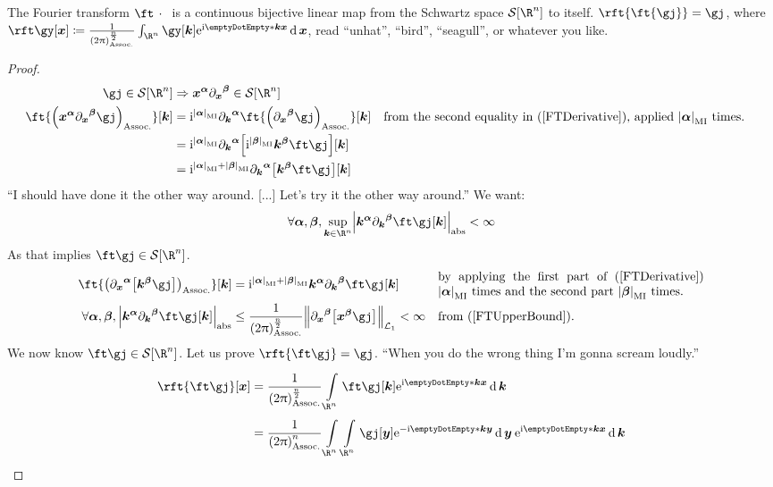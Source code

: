 \documentclass[10pt]{article}
\newcommand{\Rn}{{\R^n}}
\newcommand{\Schwartz}{{\SchwartzSpace\of{\Rn}}}
\newcommand{\sqftnrm}{\frac{1}{\pa{2\Pi}^n} }
\newcommand{\ftnrm}{\frac{1}{\pa{2\Pi}^\frac{n}{2}} }
\newcommand\commentbox[1]{\parbox{7.5cm}{#1}}
\begin{document}
  \begin{proposition}
  The Fourier transform $\ft\placeholder$ is a continuous bijective linear map from the Schwartz space $\Schwartz$ to itself. $\rft{\ft{\gj}}=\gj$, where $\rft\gy\of\vx\DefineAs\ftnrm \int\Rn\gy\of\vk\E^{\I\scal\vk\vx}\diffd\vx$, read ``unhat'', ``bird'', ``seagull'', or whatever you like.
  
    \begin{proof}
      \begin{align*}
        \gj\in\Schwartz&\Rightarrow\vx^\miga\pd\vx\migb\in\Schwartz \\
        \ft{\pa{\vx^\miga\pd\vx\migb\gj}}\of\vk
        &=\I^{\total\miga}\pd\vk\miga\ft{\pa{\pd\vx\migb\gj}}\of\vk 
          && \text{from the second equality in (\ref{FTDerivative}), applied }\total\miga\text{ times.} \\
        &=\I^{\total\miga}\pd\vk\miga\of{\I^{\total\migb}\vk^\migb\ft\gj}\of\vk \\
        &=\I^{\total\miga+\total\migb}\pd\vk\miga\of{\vk^\migb\ft\gj}\of\vk
      \end{align*}
      ``I should have done it the other way around. [...] Let's try it the other way around.''
      We want:
      \begin{equation*}
        \forall\miga,\migb,\sup_{\vk\in\Rn}\abs{\vk^\miga\pd\vk\migb\ft\gj\of\vk}<\infty
      \end{equation*}
      As that implies $\ft\gj\in\Schwartz$.
      \begin{align*}
        \ft{\pa{\pd\vx\miga\of{\vk^\migb\gj}}}\of\vk
        &=\I^{\total\miga+\total\migb}\vk^\miga\pd\vk\migb\ft\gj\of\vk
        && \commentbox{by applying the first part of (\ref{FTDerivative}) $\total\miga
        $ times and the second part $\total\migb$ times.}\\
        \forall\miga,\migb,\abs{\vk^\miga\pd\vk\migb\ft\gj\of\vk}
        &\leq\ftnrm\Lnorm[1]{\pd\vx\migb\of{\vx^\migb\gj}}<\infty
        && \text{from (\ref{FTUpperBound}).}
      \end{align*}
      We now know $\ft\gj\in\Schwartz$.
      Let us prove $\rft{\ft\gj}=\gj$. ``When you do the wrong thing I'm gonna scream loudly.''
      \begin{align*}
        \rft{\ft\gj}\of\vx&=\ftnrm\int\Rn\ft\gj\of\vk\E^{\I\scal\vk\vx}\diffd\vk \\
        &=\sqftnrm\int\Rn\int\Rn\gj\of\vy\E^{-\I\scal\vk\vy}\diffd\vy\:\E^{\I\scal\vk\vx}\diffd\vk
      \end{align*}

\end{proof}
\end{proposition}
\end{document}
